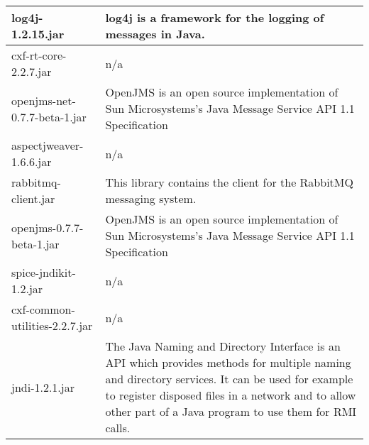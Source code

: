 \begin{center}
\begin{longtable}{|p{}|p{}|}
\hline 
log4j-1.2.15.jar & log4j is a framework for the logging of messages in Java.\\
\hline 
cxf-rt-core-2.2.7.jar & n/a\\
\hline 
openjms-net-0.7.7-beta-1.jar & OpenJMS is an open source implementation of Sun Microsystems's Java Message Service API 1.1 Specification\\
\hline 
aspectjweaver-1.6.6.jar & n/a\\
\hline 
rabbitmq-client.jar & This library contains the client for the RabbitMQ messaging system.\\
\hline 
openjms-0.7.7-beta-1.jar & OpenJMS is an open source implementation of Sun Microsystems's Java Message Service API 1.1 Specification\\
\hline 
spice-jndikit-1.2.jar & n/a\\
\hline 
cxf-common-utilities-2.2.7.jar & n/a\\
\hline 
jndi-1.2.1.jar & The Java Naming and Directory Interface is an API which provides methods for multiple naming and directory services. It can be used for example to register disposed files in a network and to allow other part of a Java program to use them for RMI calls.\\
\hline 
\end{longtable}
\label{tabular:libraries}
\end{center}
